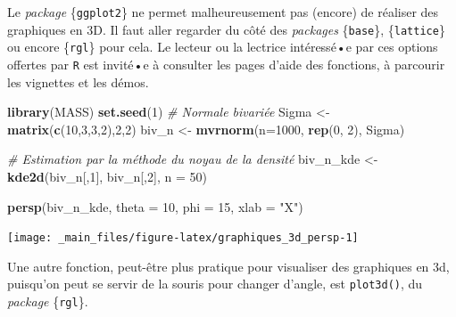 \documentclass[
  11pt,
]{book}
\newenvironment{Shaded}{\begin{snugshade}}{\end{snugshade}}
\newcommand{\CommentTok}[1]{\textcolor[rgb]{0.56,0.35,0.01}{\textit{#1}}}
\newcommand{\DataTypeTok}[1]{\textcolor[rgb]{0.13,0.29,0.53}{#1}}
\newcommand{\DecValTok}[1]{\textcolor[rgb]{0.00,0.00,0.81}{#1}}
\newcommand{\KeywordTok}[1]{\textcolor[rgb]{0.13,0.29,0.53}{\textbf{#1}}}
\newcommand{\NormalTok}[1]{#1}
\newcommand{\StringTok}[1]{\textcolor[rgb]{0.31,0.60,0.02}{#1}}
\numberwithin{equation}{section}
\numberwithin{countremarque}{section}
\begin{document}
Le \emph{package} \{\texttt{ggplot2}\} ne permet malheureusement pas (encore) de réaliser des graphiques en 3D. Il faut aller regarder du côté des \emph{packages} \{\texttt{base}\}, \{\texttt{lattice}\} ou encore \{\texttt{rgl}\} pour cela. Le lecteur ou la lectrice intéressé•e par ces options offertes par \texttt{R} est invité•e à consulter les pages d'aide des fonctions, à parcourir les vignettes et les démos.

\begin{Shaded}
\begin{Highlighting}[]
\KeywordTok{library}\NormalTok{(MASS)}
\KeywordTok{set.seed}\NormalTok{(}\DecValTok{1}\NormalTok{)}
\CommentTok{\# Normale bivariée}
\NormalTok{Sigma \textless{}{-}}\StringTok{ }\KeywordTok{matrix}\NormalTok{(}\KeywordTok{c}\NormalTok{(}\DecValTok{10}\NormalTok{,}\DecValTok{3}\NormalTok{,}\DecValTok{3}\NormalTok{,}\DecValTok{2}\NormalTok{),}\DecValTok{2}\NormalTok{,}\DecValTok{2}\NormalTok{)}
\NormalTok{biv\_n \textless{}{-}}\StringTok{ }\KeywordTok{mvrnorm}\NormalTok{(}\DataTypeTok{n=}\DecValTok{1000}\NormalTok{, }\KeywordTok{rep}\NormalTok{(}\DecValTok{0}\NormalTok{, }\DecValTok{2}\NormalTok{), Sigma)}

\CommentTok{\# Estimation par la méthode du noyau de la densité}
\NormalTok{biv\_n\_kde \textless{}{-}}\StringTok{ }\KeywordTok{kde2d}\NormalTok{(biv\_n[,}\DecValTok{1}\NormalTok{], biv\_n[,}\DecValTok{2}\NormalTok{], }\DataTypeTok{n =} \DecValTok{50}\NormalTok{)}

\KeywordTok{persp}\NormalTok{(biv\_n\_kde, }\DataTypeTok{theta =} \DecValTok{10}\NormalTok{, }\DataTypeTok{phi =} \DecValTok{15}\NormalTok{, }\DataTypeTok{xlab =} \StringTok{"X"}\NormalTok{)}
\end{Highlighting}
\end{Shaded}

\begin{center}\texttt{[image: \_main\_files/figure-latex/graphiques\_3d\_persp-1]} \end{center}

Une autre fonction, peut-être plus pratique pour visualiser des graphiques en 3d, puisqu'on peut se servir de la souris pour changer d'angle, est \texttt{plot3d()}, du \emph{package} \{\texttt{rgl}\}.
\end{document}
